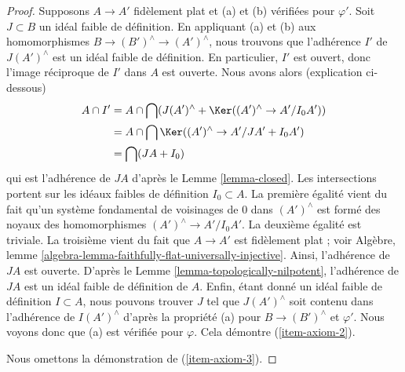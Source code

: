 \begin{proof}
\medskip\noindent
Supposons $A \to A'$ fidèlement plat et (a) et (b) vérifiées pour $\varphi'$.
Soit $J \subset B$ un idéal faible de définition. En appliquant (a) et (b)
aux homomorphismes $B \to (B')^\wedge \to (A')^\wedge$, nous trouvons que
l'adhérence $I'$ de $J(A')^\wedge$ est un idéal faible de définition.
En particulier, $I'$ est ouvert, donc l'image réciproque de $I'$
dans $A$ est ouverte. Nous avons alors (explication ci-dessous)
\begin{align*}
A \cap I'
& =
A \cap \bigcap (J(A')^\wedge + \Ker((A')^\wedge \to A'/I_0A')) \\
& =
A \cap \bigcap \Ker((A')^\wedge \to A'/JA' + I_0 A') \\
& = \bigcap (JA + I_0)
\end{align*}
qui est l'adhérence de $JA$ d'après le Lemme \ref{lemma-closed}.
Les intersections portent sur les idéaux faibles de définition $I_0 \subset A$.
La première égalité vient du fait qu'un système fondamental de voisinages de
$0$ dans $(A')^\wedge$ est formé des noyaux des homomorphismes $(A')^\wedge \to A'/I_0A'$.
La deuxième égalité est triviale. La troisième vient du fait que $A \to A'$
est fidèlement plat ; voir
Algèbre, lemme \ref{algebra-lemma-faithfully-flat-universally-injective}.
Ainsi, l'adhérence de $JA$ est ouverte. D'après le Lemme \ref{lemma-topologically-nilpotent},
l'adhérence de $JA$
est un idéal faible de définition de $A$. Enfin, étant donné un idéal faible
de définition $I \subset A$, nous pouvons trouver $J$ tel que
$J(A')^\wedge$ soit contenu dans l'adhérence de $I(A')^\wedge$
d'après la propriété (a) pour $B \to (B')^\wedge$ et $\varphi'$.
Nous voyons donc que (a) est vérifiée pour $\varphi$. Cela démontre (\ref{item-axiom-2}).

\medskip\noindent
Nous omettons la démonstration de (\ref{item-axiom-3}).
\end{proof}

